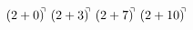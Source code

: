 \documentclass[preview]{standalone}
\begin{document}
\begin{align*}
(2+0)^{\hspace{-0.1cm}\urcorner} \ (2+3)^{\hspace{-0.1cm}\urcorner} \ (2+7)^{\hspace{-0.1cm}\urcorner} \ (2+10)^{\hspace{-0.1cm}\urcorner}
\end{align*}
\end{document}
